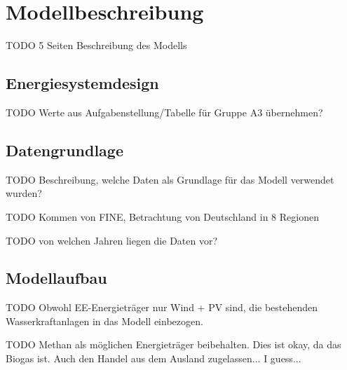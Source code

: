 \section{Modellbeschreibung}
TODO 5 Seiten Beschreibung des Modells

\subsection{Energiesystemdesign}
TODO Werte aus Aufgabenstellung/Tabelle für Gruppe A3 übernehmen?

\subsection{Datengrundlage}
TODO Beschreibung, welche Daten als Grundlage für das Modell verwendet wurden?

TODO Kommen von FINE, Betrachtung von Deutschland in 8 Regionen

TODO von welchen Jahren liegen die Daten vor?

\subsection{Modellaufbau}
TODO Obwohl EE-Energieträger nur Wind + PV sind, die bestehenden Wasserkraftanlagen in das Modell einbezogen.

TODO Methan als möglichen Energieträger beibehalten. Dies ist okay, da das Biogas ist. Auch den Handel aus dem Ausland zugelassen... I guess... 

